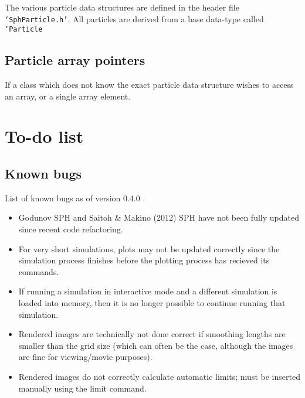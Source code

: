 \documentclass[a4paper]{article}
\newcommand{\VERNO}{0.4.0 }
\newcommand{\var}[1]{\texttt{#1}}
\begin{document}
The various particle data structures are defined in the header file \var{`SphParticle.h'}.  All particles are derived from a base data-type called \var{`Particle}




\subsection{Particle array pointers}

If a class which does not know the exact particle data structure wishes to access an array, or a single array element.



\newpage


\section{To-do list}

\subsection{Known bugs}
List of known bugs as of version \VERNO.

\begin{itemize}
\item Godunov SPH and Saitoh \& Makino (2012) SPH have not been fully updated since recent code refactoring.
\item For very short simulations, plots may not be updated correctly since the simulation process finishes before the plotting process has recieved its commands.
\item If running a simulation in interactive mode and a different simulation is loaded into memory, then it is no longer possible to continue running that simulation.
\item Rendered images are technically not done correct if smoothing lengths are smaller than the grid size (which can often be the case, although the images are fine for viewing/movie purposes).
\item Rendered images do not correctly calculate automatic limits; must be inserted manually using the limit command.
\end{itemize}
\end{document}
